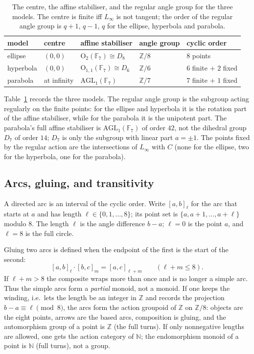\documentclass[11pt]{article}
\theoremstyle{definition}
\theoremstyle{remark}
\newcommand{\F}{\mathbb{F}}
\newcommand{\Z}{\mathbb{Z}}
\newcommand{\N}{\mathbb{N}}
\begin{document}
\begin{table}[htbp]
\centering
\small
\begin{tabularx}{\textwidth}{@{}>{\raggedright\arraybackslash}p{}>{\raggedright\arraybackslash}p{}>{\raggedright\arraybackslash}p{}>{\raggedright\arraybackslash}p{}X@{}}
\toprule
model & centre & affine stabiliser & angle group & cyclic order\\
\midrule
ellipse & $(0,0)$ & $\mathrm{O}_2(\F_7)\cong D_8$ & $\Z/8$ & $8$ points\\
hyperbola & $(0,0)$ & $\mathrm{O}_{1,1}(\F_7)\cong D_6$ & $\Z/6$ & $6$ finite $+$ $2$ fixed\\
parabola & at infinity & $\mathrm{AGL}_1(\F_7)$ & $\Z/7$ & $7$ finite $+$ $1$ fixed\\
\bottomrule
\end{tabularx}
\caption{The centre, the affine stabiliser, and the regular angle group for the
three models.  The centre is finite iff $L_\infty$ is not tangent; the order of
the regular angle group is $q+1$, $q-1$, $q$ for the ellipse, hyperbola and
parabola.}
\label{tab:center}
\end{table}

Table~\ref{tab:center} records the three models.  The regular angle group is
the subgroup acting regularly on the finite points: for the ellipse and
hyperbola it is the rotation part of the affine stabiliser, while for the
parabola it is the unipotent part.  The parabola's full affine stabiliser is
$\mathrm{AGL}_1(\F_7)$ of order $42$, not the dihedral group $D_7$ of order $14$;
$D_7$ is only the subgroup with linear part $a=\pm1$.  The points fixed by the
regular action are the intersections of $L_\infty$ with $C$ (none for the
ellipse, two for the hyperbola, one for the parabola).

\subsection{Arcs, gluing, and transitivity}
\label{subsec:arcs}

A directed arc is an interval of the cyclic order.  Write $[a,b]_\ell$ for the
arc that starts at $a$ and has length $\ell\in\{0,1,\dots,8\}$; its point set is
$\{a,a+1,\dots,a+\ell\}$ modulo $8$.  The length $\ell$ is the angle difference
$b-a$; $\ell=0$ is the point $a$, and $\ell=8$ is the full circle.

Gluing two arcs is defined when the endpoint of the first is the start of the
second:
\[
  [a,b]_\ell\cdot[b,c]_m=[a,c]_{\ell+m}
  \qquad(\ell+m\le8).
\]
If $\ell+m>8$ the composite wraps more than once and is no longer a simple arc.
Thus the simple arcs form a \emph{partial} monoid, not a monoid.  If one keeps
the winding, i.e.\ lets the length be an integer in $\Z$ and records the
projection $b-a\equiv\ell\pmod8$, the arcs form the action groupoid of $\Z$ on
$\Z/8$: objects are the eight points, arrows are the based arcs, composition is
gluing, and the automorphism group of a point is $\Z$ (the full turns).  If only
nonnegative lengths are allowed, one gets the action category of $\N$; the
endomorphism monoid of a point is $\N$ (full turns), not a group.
\end{document}
